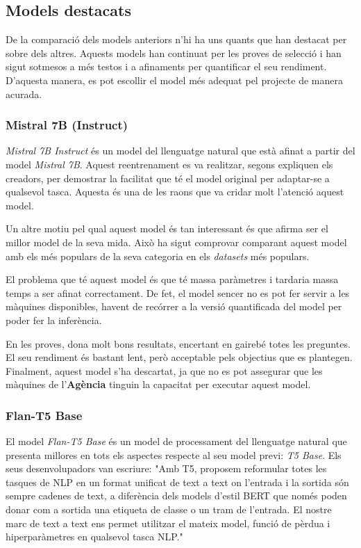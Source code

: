 \subsection{Models destacats}
De la comparació dels models anteriors n'hi ha uns quants que han destacat per sobre dels altres. Aquests models han continuat per les proves de selecció i han sigut sotmesos a més testos i a afinaments per quantificar el seu rendiment. D'aquesta manera, es pot escollir el model més adequat pel projecte de manera acurada.

\subsubsection{Mistral 7B (Instruct)}
\textit{Mistral 7B Instruct} és un model del llenguatge natural que està afinat a partir del model \textit{Mistral 7B}. Aquest reentrenament es va realitzar, segons expliquen els creadors, per demostrar la facilitat que té el model original per adaptar-se a qualsevol tasca. Aquesta és una de les raons que va cridar molt l'atenció aquest model.

Un altre motiu pel qual aquest model és tan interessant és que afirma ser el millor model de la seva mida. Això ha sigut comprovar comparant aquest model amb els més populars de la seva categoria en els \textit{datasets} més populars.

El problema que té aquest model és que té massa paràmetres i tardaria massa temps a ser afinat correctament. De fet, el model sencer no es pot fer servir a les màquines disponibles, havent de recórrer a la versió quantificada del model per poder fer la inferència.

En les proves, dona molt bons resultats, encertant en gairebé totes les preguntes. El seu rendiment és bastant lent, però acceptable pels objectius que es plantegen. Finalment, aquest model s'ha descartat, ja que no es pot assegurar que les màquines de l'\textbf{Agència} tinguin la capacitat per executar aquest model.

\subsubsection{Flan-T5 Base}
El model \textit{Flan-T5 Base} és un model de processament del llenguatge natural que presenta millores en tots els aspectes respecte al seu model previ: \textit{T5 Base}. Els seus desenvolupadors van escriure: "Amb T5, proposem reformular totes les tasques de NLP en un format unificat de text a text on l'entrada i la sortida són sempre cadenes de text, a diferència dels models d'estil BERT que només poden donar com a sortida una etiqueta de classe o un tram de l'entrada. El nostre marc de text a text ens permet utilitzar el mateix model, funció de pèrdua i hiperparàmetres en qualsevol tasca NLP."

